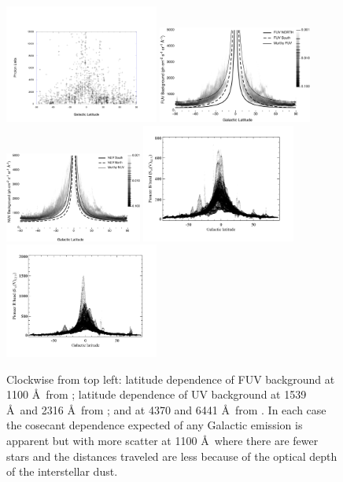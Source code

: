 \documentclass{iau}
\begin{document}
\begin{figure}[t]
\begin{center}
 \includegraphics[width=0.45\textwidth]{voy_gb.pdf} 
 \includegraphics[width=0.45\textwidth]{galex_fuv_csc.pdf} 
 \includegraphics[width=0.4\textwidth]{galex_nuv_csc.pdf} 
 \includegraphics[width=0.45\textwidth]{pioneer_b_lat.pdf} 
 \includegraphics[width=0.45\textwidth]{pioneer_r_lat.pdf} 
 \caption{Clockwise from top left: latitude dependence of FUV background at 1100 \AA\ from \citet{Murthyvoy_all}; latitude dependence of UV background at 1539 \AA\ and 2316 \AA\ from \citet{Murthy2014apj}; and at 4370 and 6441 \AA\ from \citet{Gordon_Pioneer1998}. In each case the cosecant dependence expected of any Galactic emission is apparent but with more scatter at 1100 \AA\ where there are fewer stars and the distances traveled are less because of the optical depth of the interstellar dust.}
  \label{Fig:voy_gb}
\end{center}
\end{figure}
\end{document}
